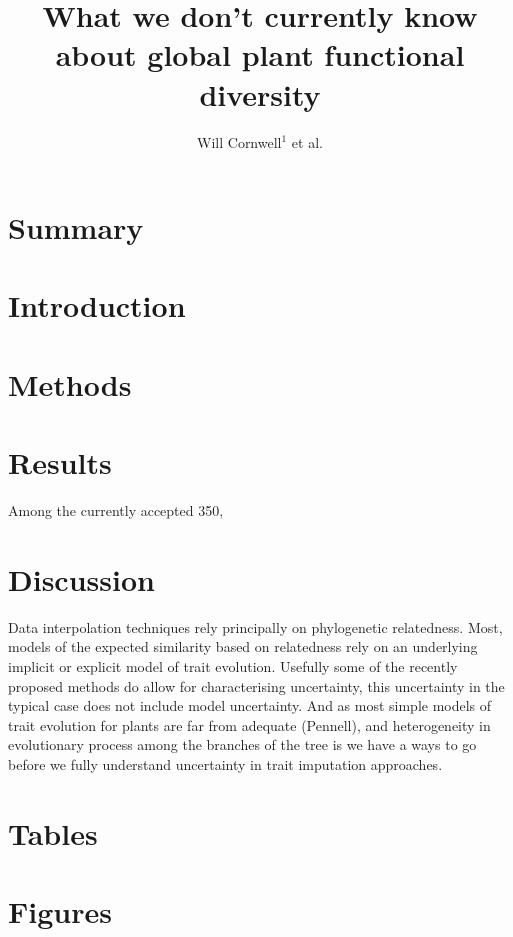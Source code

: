 \documentclass[a4paper,11pt]{article}
\title{What we don't currently know about global plant functional diversity}
\author{
Will Cornwell$^1$
et al.}
\affiliation{
*final list and order undecided\\
$^1$ University of NSW\\
}
\date{}
\begin{document}
\mstitlepage
\noindent

\section{Summary}


\section{Introduction}

\section{Methods}

\section{Results}

Among the currently accepted 350,


\section{Discussion}




Data interpolation techniques rely principally on phylogenetic relatedness.  
Most, models of the expected similarity based on relatedness rely on an underlying implicit or explicit model of trait evolution.  
Usefully some of the recently proposed methods do allow for characterising uncertainty, this uncertainty in the typical case
does not include model uncertainty.  And as most simple models of trait evolution for plants are far from adequate (Pennell), and heterogeneity in evolutionary 
process among the branches of the tree is 
we have a ways to go before we fully understand uncertainty in trait imputation approaches.   

\section{Tables}









\section{Figures}
\end{document}
